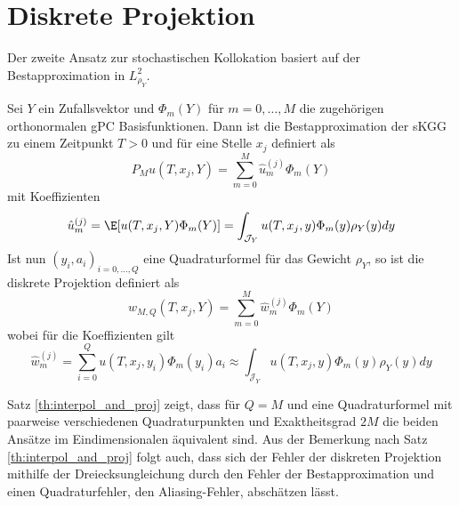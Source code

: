 \section{Diskrete Projektion}
\label{sec:discrete_proj}
Der zweite Ansatz zur stochastischen Kollokation basiert auf der Bestapproximation in $L_{\rho_Y}^2$.
\begin{mathdef}
Sei $Y$ ein Zufallsvektor und $\Phi_m(Y)$ für $m=0,\dots,M$ die zugehörigen orthonormalen gPC Basisfunktionen. Dann ist die Bestapproximation der sKGG zu einem Zeitpunkt $T>0$ und für eine Stelle $x_j$ definiert als
\[P_Mu(T,x_j,Y)=\sum_{m=0}^M\hat{u}_m^{(j)}\Phi_m(Y)\]
mit Koeffizienten
\[\hat{u}_m^{(j)}=\E[u(T,x_j,Y)\Phi_m(Y)]=\int_{\mathcal{J}_Y} u(T,x_j,y)\Phi_m(y)\rho_Y(y)dy\]
Ist nun $(y_i,a_i)_{i=0,\dots,Q}$ eine Quadraturformel für das Gewicht $\rho_Y$, so ist die diskrete Projektion definiert als
\[w_{M,Q}(T,x_j,Y)=\sum_{m=0}^M\hat{w}_m^{(j)}\Phi_m(Y)\] wobei für die Koeffizienten gilt
\[\hat{w}_m^{(j)}=\sum_{i=0}^Qu(T,x_j,y_i)\Phi_m(y_i)a_i\approx \int_{\mathcal{J}_Y} u(T,x_j,y)\Phi_m(y)\rho_Y(y)dy\]
\end{mathdef}
Satz \ref{th:interpol_and_proj} zeigt, dass für $Q=M$ und eine Quadraturformel mit paarweise verschiedenen Quadraturpunkten und Exaktheitsgrad $2M$ die beiden Ansätze im Eindimensionalen äquivalent sind. Aus der Bemerkung nach Satz \ref{th:interpol_and_proj} folgt auch, dass sich der Fehler der diskreten Projektion mithilfe der Dreiecksungleichung durch den Fehler der Bestapproximation und einen Quadraturfehler, den Aliasing-Fehler, abschätzen lässt.

